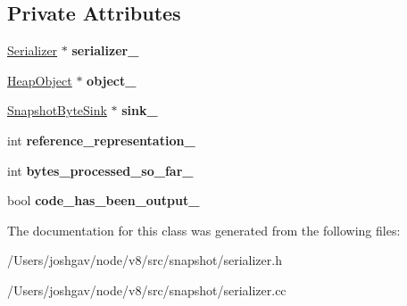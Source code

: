 \subsection*{Private Attributes}
\begin{DoxyCompactItemize}
\item 
\hyperlink{classv8_1_1internal_1_1_serializer}{Serializer} $\ast$ {\bfseries serializer\+\_\+}\hypertarget{classv8_1_1internal_1_1_serializer_1_1_object_serializer_aaab885cca1150b0ff3f285998bb4b7d8}{}\label{classv8_1_1internal_1_1_serializer_1_1_object_serializer_aaab885cca1150b0ff3f285998bb4b7d8}

\item 
\hyperlink{classv8_1_1internal_1_1_heap_object}{Heap\+Object} $\ast$ {\bfseries object\+\_\+}\hypertarget{classv8_1_1internal_1_1_serializer_1_1_object_serializer_afec414345b0e8c005bcef221a016dad2}{}\label{classv8_1_1internal_1_1_serializer_1_1_object_serializer_afec414345b0e8c005bcef221a016dad2}

\item 
\hyperlink{classv8_1_1internal_1_1_snapshot_byte_sink}{Snapshot\+Byte\+Sink} $\ast$ {\bfseries sink\+\_\+}\hypertarget{classv8_1_1internal_1_1_serializer_1_1_object_serializer_acd649c1ab2a6485719c380a7d195337a}{}\label{classv8_1_1internal_1_1_serializer_1_1_object_serializer_acd649c1ab2a6485719c380a7d195337a}

\item 
int {\bfseries reference\+\_\+representation\+\_\+}\hypertarget{classv8_1_1internal_1_1_serializer_1_1_object_serializer_af7a0222fbae677b8b4d9cfd79d888e13}{}\label{classv8_1_1internal_1_1_serializer_1_1_object_serializer_af7a0222fbae677b8b4d9cfd79d888e13}

\item 
int {\bfseries bytes\+\_\+processed\+\_\+so\+\_\+far\+\_\+}\hypertarget{classv8_1_1internal_1_1_serializer_1_1_object_serializer_a35f9cc35cf530826d714d7f88a179e89}{}\label{classv8_1_1internal_1_1_serializer_1_1_object_serializer_a35f9cc35cf530826d714d7f88a179e89}

\item 
bool {\bfseries code\+\_\+has\+\_\+been\+\_\+output\+\_\+}\hypertarget{classv8_1_1internal_1_1_serializer_1_1_object_serializer_aca62dc7f47d0960a71d46dd704448b99}{}\label{classv8_1_1internal_1_1_serializer_1_1_object_serializer_aca62dc7f47d0960a71d46dd704448b99}

\end{DoxyCompactItemize}


The documentation for this class was generated from the following files\+:\begin{DoxyCompactItemize}
\item 
/\+Users/joshgav/node/v8/src/snapshot/serializer.\+h\item 
/\+Users/joshgav/node/v8/src/snapshot/serializer.\+cc\end{DoxyCompactItemize}
